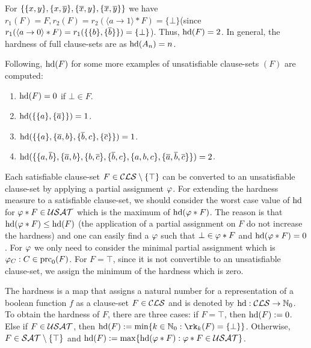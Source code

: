 \documentclass[]{book}
\begin{document}
\begin{examp}\label{exp:harducls}
For $\{ \{ x,y \},\{ x,\overline{y} \},\{ \overline{x},y \},\{ \overline{x},\overline{y} \} \}$ we have $r_1(F)=F, r_2(F)=r_2( \langle a \rightarrow 1 \rangle * F) = \{ \bot \}$(since $r_1( \langle a \rightarrow 0 \rangle * F)=r_1 (\{\{ b \}, \{ \overline b \}\}) = \{ \bot \}$). Thus, $\operatorname{hd}(F) = 2$. In general, the hardness of full clause-sets are as $\operatorname{hd}(A_n)=n$.
  
Following, $\operatorname{hd}(F)$ for some more examples of unsatisfiable clause-sets $(F)$ are computed:
  \begin{enumerate}
  \item $\operatorname{hd}(F) = 0$ if $\bot \in F$.
  \item $\operatorname{hd}(\{ \{ a \},\{ \overline{a} \} \}) = 1$.
  \item $\operatorname{hd}(\{ \{ a \},\{ \overline{a},b \}, \{ \overline{b},c \}, \{ \overline{c} \} \}) = 1$. 
  \item $\operatorname{hd}(\{ \{ a,\overline{b} \},\{ \overline{a},b \},\{ b,\overline{c} \},\{ \overline{b},c \},\{ a,b,c \},\{ \overline{a},\overline{b},\overline{c} \} \}) = 2$.
  \end{enumerate}
\end{examp}

Each satisfiable clause-set $F \in \mathcal{CLS} \setminus \{ \top \}$ can be converted to an unsatisfiable clause-set by applying a partial assignment $\varphi$. For extending the hardness measure to a satisfiable clause-set, we should consider the worst case value of $\operatorname{hd}$ for $\varphi * F \in \mathcal{USAT}$ which is the maximum of $\operatorname{hd}(\varphi * F)$. The reason is that $\operatorname{hd}(\varphi * F) \leq \operatorname{hd}(F)$ (the application of a partial assignment on $F$ do not increase the hardness) and one can easily find a $\varphi$ such that $\bot \in \varphi * F$ and $\operatorname{hd}(\varphi * F)=0$. For $\varphi$ we only need to consider the minimal partial assignment which is $\varphi_C : C \in \operatorname{prc}_0(F)$. For $F = \top$, since it is not convertible to an unsatisfiable clause-set, we assign the minimum of the hardness which is zero.

\begin{defi}\label{def:hd-extended}
The hardness is a map that assigns a natural number for a representation of a boolean function $f$ as a clause-set $F \in \mathcal{CLS}$ and is denoted by $\operatorname{hd} : \mathcal{CLS} \rightarrow \mathbb{N}_0$. To obtain the hardness of  $F$, there are three cases: if $F = \top$, then $\operatorname{hd}(F) := 0$. Else if $F \in \mathcal{USAT}$, then $\hardness(F) := \min \set{k \in \NNZ : \rk_k(F)=\set{\bot}}$. Otherwise, $F \in \mathcal{SAT} \setminus \{ \top \}$ and $\operatorname{hd}(F) := \max \{  \operatorname{hd}(\varphi * F) : \varphi * F \in \mathcal{USAT}  \}$.
\end{defi}
\end{document}
